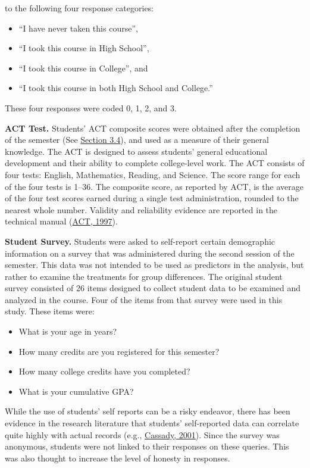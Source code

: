\documentclass[11pt]{umnthesis}
\begin{document}
to the following four response categories:

\begin{itemize}
\tightlist
\item
  ``I have never taken this course'',
\item
  ``I took this course in High School'',
\item
  ``I took this course in College'', and
\item
  ``I took this course in both High School and College.''
\end{itemize}

These four responses were coded 0, 1, 2, and 3.

\textbf{ACT Test.} Students' ACT composite scores were obtained after the completion of the semester (See \protect\hyperlink{timeline}{Section 3.4}), and used as a measure of their general knowledge. The ACT is designed to assess students' general educational development and their ability to complete college-level work. The ACT consists of four tests: English, Mathematics, Reading, and Science. The score range for each of the four tests is 1--36. The composite score, as reported by ACT, is the average of the four test scores earned during a single test administration, rounded to the nearest whole number. Validity and reliability evidence are reported in the technical manual (\protect\hyperlink{ref-act:1997}{ACT, 1997}).

\textbf{Student Survey.} Students were asked to self-report certain demographic information on a survey that was administered during the second session of the semester. This data was not intended to be used as predictors in the analysis, but rather to examine the treatments for group differences. The original student survey consisted of 26 items designed to collect student data to be examined and analyzed in the course. Four of the items from that survey were used in this study. These items were:

\begin{itemize}
\tightlist
\item
  What is your age in years?
\item
  How many credits are you registered for this semester?
\item
  How many college credits have you completed?
\item
  What is your cumulative GPA?
\end{itemize}

While the use of students' self reports can be a risky endeavor, there has been evidence in the research literature that students' self-reported data can correlate quite highly with actual records (e.g., \protect\hyperlink{ref-cassady:2001}{Cassady, 2001}). Since the survey was anonymous, students were not linked to their responses on these queries. This was also thought to increase the level of honesty in responses.
\end{document}
